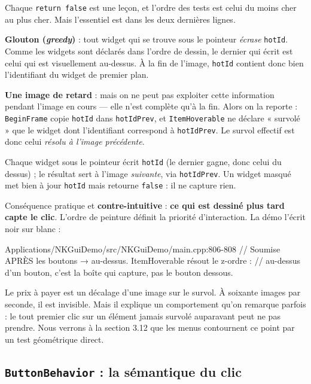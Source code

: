 Chaque \texttt{return false} est une leçon, et l'ordre des tests est celui du
moins cher au plus cher. Mais l'essentiel est dans les deux dernières lignes.

\textbf{Glouton (\emph{greedy})} : tout widget qui se trouve sous le pointeur
\emph{écrase} \texttt{hotId}. Comme les widgets sont déclarés dans l'ordre de
dessin, le dernier qui écrit est celui qui est visuellement au-dessus. À la fin
de l'image, \texttt{hotId} contient donc bien l'identifiant du widget de premier
plan.

\textbf{Une image de retard} : mais on ne peut pas exploiter cette information
pendant l'image en cours — elle n'est complète qu'à la fin. Alors on la reporte :
\texttt{BeginFrame} copie \texttt{hotId} dans \texttt{hotIdPrev}, et
\texttt{ItemHoverable} ne déclare « survolé » que le widget dont l'identifiant
correspond à \texttt{hotIdPrev}. Le survol effectif est donc celui \emph{résolu à
l'image précédente}.

\begin{nkretenir}
Chaque widget sous le pointeur écrit \texttt{hotId} (le dernier gagne, donc
celui du dessus) ; le résultat sert à l'image \emph{suivante}, via
\texttt{hotIdPrev}. Un widget masqué met bien à jour \texttt{hotId} mais retourne
\texttt{false} : il ne capture rien.

Conséquence pratique et \textbf{contre-intuitive} : \textbf{ce qui est dessiné
plus tard capte le clic}. L'ordre de peinture définit la priorité d'interaction.
La démo l'écrit noir sur blanc :

\begin{nkcode}{Applications/NKGuiDemo/src/NKGuiDemo/main.cpp:806-808}
// Soumise APRÈS les boutons → au-dessus. ItemHoverable résout le z-ordre :
// au-dessus d'un bouton, c'est la boîte qui capture, pas le bouton dessous.
\end{nkcode}
\end{nkretenir}

Le prix à payer est un décalage d'une image sur le survol. À soixante images par
seconde, il est invisible. Mais il explique un comportement qu'on remarque
parfois : le tout premier clic sur un élément jamais survolé auparavant peut ne
pas prendre. Nous verrons à la section 3.12 que les menus contournent ce point
par un test géométrique direct.

\subsection{\texttt{ButtonBehavior} : la sémantique du clic}

